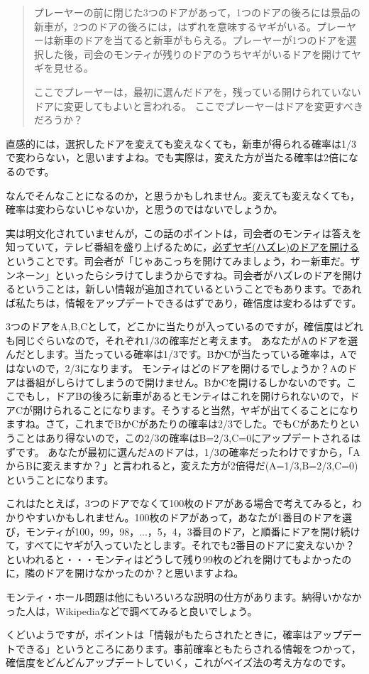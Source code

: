 \documentclass{ltjbook}
\begin{document}
\begin{quotation}
	プレーヤーの前に閉じた3つのドアがあって，1つのドアの後ろには景品の新車が，2つのドアの後ろには，はずれを意味するヤギがいる。プレーヤーは新車のドアを当てると新車がもらえる。プレーヤーが1つのドアを選択した後，司会のモンティが残りのドアのうちヤギがいるドアを開けてヤギを見せる。

	ここでプレーヤーは，最初に選んだドアを，残っている開けられていないドアに変更してもよいと言われる。
	ここでプレーヤーはドアを変更すべきだろうか？
\end{quotation}

直感的には，選択したドアを変えても変えなくても，新車が得られる確率は1/3で変わらない，と思いますよね。でも実際は，変えた方が当たる確率は2倍になるのです。

なんでそんなことになるのか，と思うかもしれません。変えても変えなくても，確率は変わらないじゃないか，と思うのではないでしょうか。

実は明文化されていませんが，この話のポイントは，司会者のモンティは答えを知っていて，テレビ番組を盛り上げるために，\underline{必ずヤギ(ハズレ)のドアを開ける}ということです。司会者が「じゃあこっちを開けてみましょう，わー新車だ。ザンネーン」といったらシラけてしまうからですね。司会者がハズレのドアを開けるということは，新しい情報が追加されているということでもあります。であれば私たちは，情報をアップデートできるはずであり，確信度は変わるはずです。

3つのドアをA,B,Cとして，どこかに当たりが入っているのですが，確信度はどれも同じぐらいなので，それぞれ1/3の確率だと考えます。
あなたがAのドアを選んだとします。当たっている確率は1/3です。BかCが当たっている確率は，Aではないので，2/3になります。
モンティはどのドアを開けるでしょうか？Aのドアは番組がしらけてしまうので開けません。BかCを開けるしかないのです。ここでもし，ドアBの後ろに新車があるとモンティはこれを開けられないので，ドアCが開けられることになります。そうすると当然，ヤギが出てくることになりますね。さて，これまでBかCがあたりの確率は2/3でした。でもCがあたりということはあり得ないので，この2/3の確率はB=2/3,C=0にアップデートされるはずです。
あなたが最初に選んだAのドアは，1/3の確率だったわけですから，「AからBに変えますか？」と言われると，変えた方が2倍得だ(A=1/3,B=2/3,C=0)ということになります。

これはたとえば，3つのドアでなくて100枚のドアがある場合で考えてみると，わかりやすいかもしれません。100枚のドアがあって，あなたが1番目のドアを選び，モンティが100，99，98，...，5，4，3番目のドア，と順番にドアを開け続けて，すべてにヤギが入っていたとします。それでも2番目のドアに変えないか？といわれると・・・モンティはどうして残り99枚のどれを開けてもよかったのに，隣のドアを開けなかったのか？と思いますよね。

モンティ・ホール問題は他にもいろいろな説明の仕方があります。納得いかなかった人は，Wikipediaなどで調べてみると良いでしょう。

くどいようですが，ポイントは「情報がもたらされたときに，確率はアップデートできる」というところにあります。事前確率ともたらされる情報をつかって，確信度をどんどんアップデートしていく，これがベイズ法の考え方なのです。
\end{document}
